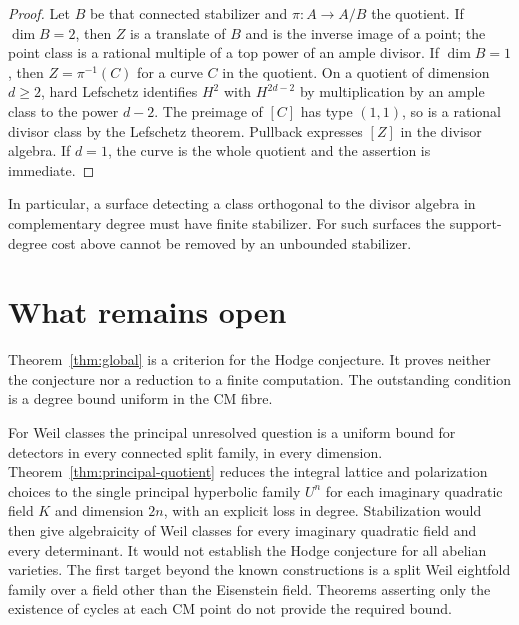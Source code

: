 \begin{proof}
Let $B$ be that connected stabilizer and $\pi:A\to A/B$ the quotient. If $\dim B=2$, then $Z$ is a translate of $B$ and is the inverse image of a point; the point class is a rational multiple of a top power of an ample divisor. If $\dim B=1$, then $Z=\pi^{-1}(C)$ for a curve $C$ in the quotient. On a quotient of dimension $d\geq2$, hard Lefschetz identifies $H^2$ with $H^{2d-2}$ by multiplication by an ample class to the power $d-2$. The preimage of $[C]$ has type $(1,1)$, so is a rational divisor class by the Lefschetz theorem. Pullback expresses $[Z]$ in the divisor algebra. If $d=1$, the curve is the whole quotient and the assertion is immediate.
\end{proof}

In particular, a surface detecting a class orthogonal to the divisor algebra in complementary degree must have finite stabilizer. For such surfaces the support-degree cost above cannot be removed by an unbounded stabilizer.



















\section{What remains open}
\label{sec:open}
Theorem~\ref{thm:global} is a criterion for the Hodge conjecture. It proves neither the conjecture nor a reduction to a finite computation. The outstanding condition is a degree bound uniform in the CM fibre.

For Weil classes the principal unresolved question is a uniform bound for detectors in every connected split family, in every dimension. Theorem~\ref{thm:principal-quotient} reduces the integral lattice and polarization choices to the single principal hyperbolic family $U^n$ for each imaginary quadratic field $K$ and dimension $2n$, with an explicit loss in degree. Stabilization would then give algebraicity of Weil classes for every imaginary quadratic field and every determinant. It would not establish the Hodge conjecture for all abelian varieties. The first target beyond the known constructions is a split Weil eightfold family over a field other than the Eisenstein field. Theorems asserting only the existence of cycles at each CM point do not provide the required bound.

